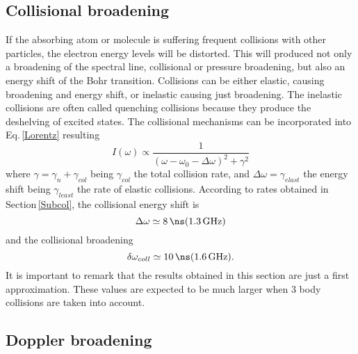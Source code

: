 \subsection{Collisional broadening}
If the absorbing atom or molecule is suffering frequent collisions with other particles, the electron energy levels will be distorted. This will produced not only a broadening of the spectral line, collisional or pressure broadening, but also an energy shift of the Bohr transition. Collisions can be either elastic, causing broadening and energy shift, or inelastic causing just broadening. The inelastic collisions are often called quenching collisions because they produce the deshelving of excited states. The collisional mechanisms can be incorporated into Eq.\,\ref{Lorentz} resulting
\begin{equation}
\label{Lorentz2}
I(\omega)\propto\frac{1}{(\omega-\omega_0-\Delta\omega)^2+\gamma^2}
\end{equation}
where $\gamma=\gamma_n+\gamma_{col}$ being $\gamma_{col}$ the total collision rate, and $\Delta\omega=\gamma_{elast}$ the energy shift being $\gamma_{least}$ the rate of elastic collisions. According to rates obtained in Section\,\ref{Subcol}, the collisional energy shift is
\begin{equation}
\Delta\omega\simeq8\,\text{\ns} (1.3\,\text{GHz})
\end{equation}
and the collisional broadening
\begin{equation}
\delta\omega_{coll}\simeq10\,\text{\ns} (1.6\,\text{GHz}).
\end{equation}
It is important to remark that the results obtained in this section are just a first approximation. These values are expected to be much larger when 3 body collisions are taken into account. 

\subsection{Doppler broadening}

